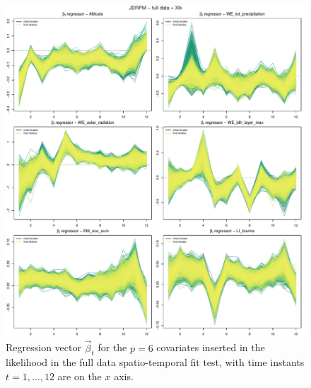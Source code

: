 \documentclass[12pt,	%
	a4paper,		%
	twoside,		%
	openright,		%
	titlepage,%
	]{book}
\theoremstyle{definition}
\begin{document}
\begin{figure}[!ht]
    \centering
    \includegraphics[width=1\linewidth]{Testing/Covariates/NA lk improvement/beta_allsJDRPM - full data + Xlk.pdf}
    \caption[Regression vector of the fit with multiple covariates in the likelihood, full dataset]{Regression vector $\vec{\beta}_t$ for the $p=6$ covariates inserted in the likelihood in the full data spatio-temporal fit test, with time instants $t=1,\ldots,12$ are on the $x$ axis.}
    \label{fig: lk regressor altitude and friends full}
\end{figure}
\end{document}
